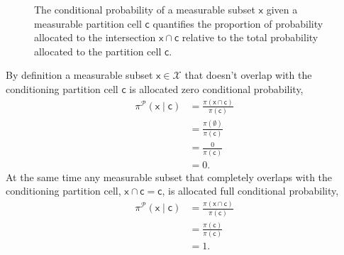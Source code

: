 \documentclass[
  letterpaper,
  DIV=11,
  numbers=noendperiod]{scrartcl}
\begin{document}
\begin{figure}


\caption{\label{fig-conditional-prob}The conditional probability of a
measurable subset \(\mathsf{x}\) given a measurable partition cell
\(\mathsf{c}\) quantifies the proportion of probability allocated to the
intersection \(\mathsf{x} \cap \mathsf{c}\) relative to the total
probability allocated to the partition cell \(\mathsf{c}\).}

\end{figure}%

By definition a measurable subset \(\mathsf{x} \in \mathcal{X}\) that
doesn't overlap with the conditioning partition cell \(\mathsf{c}\) is
allocated zero conditional probability, \begin{align*}
\pi^{\mathcal{P}}( \mathsf{x} \mid \mathsf{c} )
&=
\frac{ \pi(\mathsf{x} \cap \mathsf{c}) }{ \pi (\mathsf{c}) }
\\
&=
\frac{ \pi(\emptyset) }{ \pi (\mathsf{c}) }
\\
&=
\frac{ 0 }{ \pi (\mathsf{c}) }
\\
&=
0.
\end{align*} At the same time any measurable subset that completely
overlaps with the conditioning partition cell,
\(\mathsf{x} \cap \mathsf{c} = \mathsf{c}\), is allocated full
conditional probability, \begin{align*}
\pi^{\mathcal{P}}( \mathsf{x} \mid \mathsf{c} )
&=
\frac{ \pi(\mathsf{x} \cap \mathsf{c}) }{ \pi (\mathsf{c}) }
\\
&=
\frac{ \pi(\mathsf{c}) }{ \pi (\mathsf{c}) }
\\
&=
1.
\end{align*}
\end{document}
